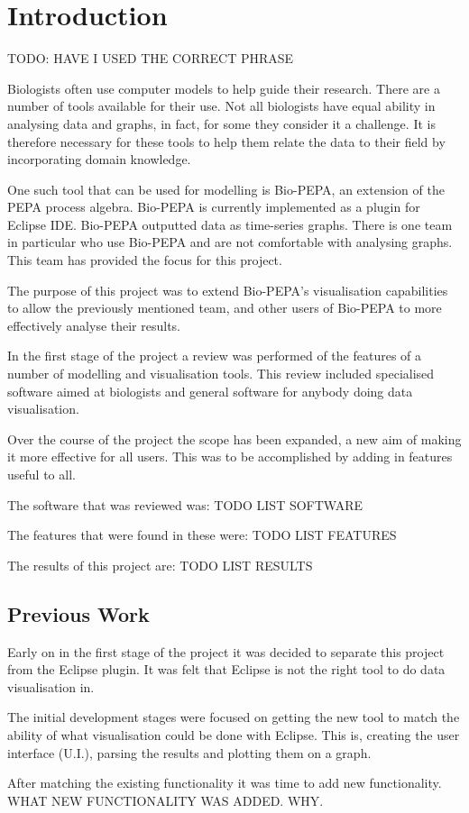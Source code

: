 \section{Introduction}

TODO: HAVE I USED THE CORRECT PHRASE

Biologists often use computer models to help guide their research.  There are a number of tools available for their use.  Not all biologists have equal ability in analysing data and graphs, in fact, for some they consider it a challenge.  It is therefore necessary for these tools to help them relate the data to their field by incorporating domain knowledge.

One such tool that can be used for modelling is Bio-PEPA, an extension of the PEPA process algebra.  Bio-PEPA is currently implemented as a plugin for Eclipse IDE.  Bio-PEPA outputted data as time-series graphs.  There is one team in particular who use Bio-PEPA and are not comfortable with analysing graphs.  This team has provided the focus for this project.

The purpose of this project was to extend Bio-PEPA's visualisation capabilities to allow the previously mentioned team, and other users of Bio-PEPA to more effectively analyse their results.

In the first stage of the project a review was performed of the features of a number of modelling and visualisation tools.  This review included specialised software aimed at biologists and general software for anybody doing data visualisation.

Over the course of the project the scope has been expanded, a new aim of making it more effective for all users.  This was to be accomplished by adding in features useful to all.

The software that was reviewed was:  TODO LIST SOFTWARE

The features that were found in these were: TODO LIST FEATURES

The results of this project are: TODO LIST RESULTS

\subsection{Previous Work}

Early on in the first stage of the project it was decided to separate this project from the Eclipse plugin.  It was felt that Eclipse is not the right tool to do data visualisation in.

The initial development stages were focused on getting the new tool to match the ability of what visualisation could be done with Eclipse.  This is, creating the user interface (U.I.), parsing the results and plotting them on a graph.

After matching the existing functionality it was time to add new functionality.
WHAT NEW FUNCTIONALITY WAS ADDED.  WHY.

